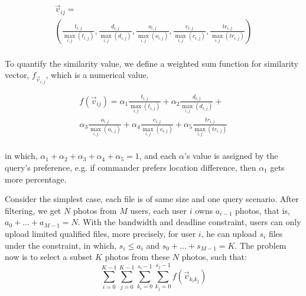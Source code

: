  \begin{equation}
\begin{array}{l}
 {\overrightarrow{v}_{ij}} =  \\
 \left( {\frac{{{t_{i,j}}}}{{\mathop {\max }\limits_{i,j} \left( {{t_{i,j}}} \right)}},\frac{{{d_{i,j}}}}{{\mathop {\max }\limits_{i,j} \left( {{d_{i,j}}} \right)}},\frac{{{o_{i,j}}}}{{\mathop {\max }\limits_{i,j} \left( {{o_{i,j}}} \right)}},\frac{{{c_{i,j}}}}{{\mathop {\max }\limits_{i,j} \left( {{c_{i,j}}} \right)}},\frac{{t{r_{i,j}}}}{{\mathop {\max }\limits_{i,j} \left( {t{r_{i,j}}} \right)}}} \right) \\
 \end{array}
 \end{equation}



To quantify the similarity value, we define a weighted sum function for similarity vector, $f_{\overrightarrow{v}_{i,j}}$, which is a numerical value.

\begin{equation}
\begin{array}{l}
 f\left( {{\overrightarrow{v}_{ij}}} \right) = {\alpha _1}\frac{{{t_{i,j}}}}{{\mathop {\max }\limits_{i,j} \left( {{t_{i,j}}} \right)}} + {\alpha _2}\frac{{{d_{i,j}}}}{{\mathop {\max }\limits_{i,j} \left( {{d_{i,j}}} \right)}} +  \\
 {\alpha _3}\frac{{{o_{i,j}}}}{{\mathop {\max }\limits_{i,j} \left( {{o_{i,j}}} \right)}} + {\alpha _4}\frac{{{c_{i,j}}}}{{\mathop {\max }\limits_{i,j} \left( {{c_{i,j}}} \right)}} + {\alpha _5}\frac{{t{r_{i,j}}}}{{\mathop {\max }\limits_{i,j} \left( {t{r_{i,j}}} \right)}} \\
 \end{array}
\end{equation}

in which, $\alpha_{1}+\alpha_{2}+\alpha_{3}+\alpha_{4}+\alpha_{5}=1$, and each $\alpha$'s value is assigned by the query's preference, e.g. if commander prefers location difference, then $\alpha_{1}$ gets more percentage.

Consider the simplest case, each file is of same size and one query scenario. After filtering, we get $N$ photos from $M$ users, each user $i$ owns $a_{i-1}$ photos, that is, $a_{0}+\ldots+a_{M-1}=N$. With the bandwidth and deadline constraint, users can only upload limited qualified files, more precisely, for user $i$, he can upload $s_{i}$ files under the constraint, in which, $s_{i}\leq a_{i}$ and $s_{0}+\ldots+s_{M-1}=K$. The problem now is to select a subset $K$ photos from these $N$ photos, such that:
\begin{equation}
\sum\limits_{i = 0}^{K - 1} {\sum\limits_{j = 0}^{K - 1} {\sum\limits_{{k_i} = 0}^{{s_i} - 1} {\sum\limits_{{k_j} = 0}^{{s_j} - 1} {f\left( {{{\vec v}_{{k_i}{k_j}}}} \right)} } } }
 \end{equation}

